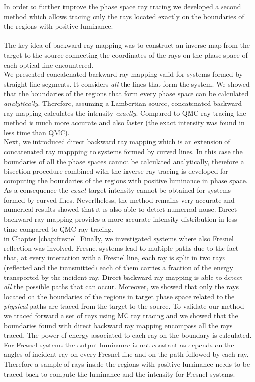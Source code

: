 In order to further improve the phase space ray tracing we developed a second method which allows tracing only the rays located exactly on the boundaries of the regions with positive luminance. 
\\ \\ \indent The key idea of backward ray mapping was to construct an inverse map from the target to the source connecting the coordinates of the rays on the phase space of each optical line encountered. \\ \indent 
We presented concatenated backward ray mapping valid for systems formed by straight line segments. It considers \textit{all} the lines that form the system. We showed that the boundaries of the regions that form every phase space can be calculated \textit{analytically}. Therefore, assuming a Lambertian source, concatenated backward ray mapping calculates the intensity \textit{exactly}. Compared to QMC ray tracing the method is much more accurate and also faster (the exact intensity was found in less time than QMC). \\\indent %
Next, we introduced direct backward ray mapping which is an extension of concatenated ray mappping to systems formed by curved lines. In this case the boundaries of all the phase spaces cannot be calculated analytically, therefore a bisection procedure combined with the inverse ray tracing is developed for computing the boundaries of the regions with positive luminance in phase space. As a consequence the \textit{exact} target intensity cannot be obtained for systems formed by curved lines. Nevertheless, the method remains very accurate and numerical results showed that it is also able to detect numerical noise. Direct backward ray mapping provides a more accurate intensity distribution in less time compared to QMC ray tracing. \\ \indent in Chapter \ref{chap:fresnel}
Finally, we investigated systems where also Fresnel reflection was involved. Fresnel systems lead to multiple paths due to the fact that, at every interaction with a Fresnel line, each ray is split in two rays (reflected and the transmitted) each of them carries a fraction of the energy transported by the incident ray. Direct backward ray mapping is able to detect \textit{all} the possible paths that can occur. Moreover, we showed that only the rays located on the boundaries of the regions in target phase space related to the \textit{physical} paths are traced from the target to the source. To validate our method we traced forward a set of rays using MC ray tracing and we showed that the boundaries found with direct backward ray mapping encompass all the rays traced. The power of energy associated to each ray on the boundary is calculated. For Fresnel systems the output luminance is not constant as depends on the angles of incident ray on every Fresnel line and on the path followed by each ray. Therefore a sample of rays inside the regions with positive luminance needs to be traced back to compute the luminance and the intensity for Fresnel systems.
